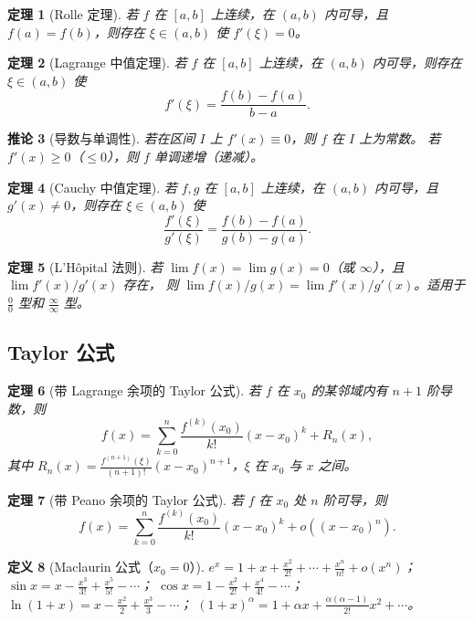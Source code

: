 \documentclass[12pt,a4paper]{ctexart}
\newtheorem{theorem}{定理}[section]
\newtheorem{definition}[theorem]{定义}
\newtheorem{corollary}[theorem]{推论}
\theoremstyle{remark}
\begin{document}
\begin{theorem}[Rolle 定理]
若 $f$ 在 $[a,b]$ 上连续，在 $(a,b)$ 内可导，且 $f(a)=f(b)$，则存在
$\xi \in (a,b)$ 使 $f'(\xi) = 0$。
\end{theorem}

\begin{theorem}[Lagrange 中值定理]
若 $f$ 在 $[a,b]$ 上连续，在 $(a,b)$ 内可导，则存在 $\xi \in (a,b)$ 使
\[
f'(\xi) = \frac{f(b)-f(a)}{b-a}.
\]
\end{theorem}

\begin{corollary}[导数与单调性]
若在区间 $I$ 上 $f'(x) \equiv 0$，则 $f$ 在 $I$ 上为常数。
若 $f'(x) \ge 0$（$\le 0$），则 $f$ 单调递增（递减）。
\end{corollary}

\begin{theorem}[Cauchy 中值定理]
若 $f,g$ 在 $[a,b]$ 上连续，在 $(a,b)$ 内可导，且 $g'(x) \neq 0$，则存在 $\xi \in (a,b)$ 使
\[
\frac{f'(\xi)}{g'(\xi)} = \frac{f(b)-f(a)}{g(b)-g(a)}.
\]
\end{theorem}

\begin{theorem}[L'H\^opital 法则]
若 $\lim f(x) = \lim g(x) = 0$（或 $\infty$），且 $\lim f'(x)/g'(x)$ 存在，
则 $\lim f(x)/g(x) = \lim f'(x)/g'(x)$。适用于 $\frac{0}{0}$ 型和 $\frac{\infty}{\infty}$ 型。
\end{theorem}

\subsection{Taylor 公式}

\begin{theorem}[带 Lagrange 余项的 Taylor 公式]
若 $f$ 在 $x_0$ 的某邻域内有 $n+1$ 阶导数，则
\[
f(x) = \sum_{k=0}^n \frac{f^{(k)}(x_0)}{k!}(x-x_0)^k + R_n(x),
\]
其中 $R_n(x) = \frac{f^{(n+1)}(\xi)}{(n+1)!}(x-x_0)^{n+1}$，$\xi$ 在 $x_0$ 与 $x$ 之间。
\end{theorem}

\begin{theorem}[带 Peano 余项的 Taylor 公式]
若 $f$ 在 $x_0$ 处 $n$ 阶可导，则
\[
f(x) = \sum_{k=0}^n \frac{f^{(k)}(x_0)}{k!}(x-x_0)^k + o((x-x_0)^n).
\]
\end{theorem}

\begin{definition}[Maclaurin 公式（$x_0=0$）]
$e^x = 1 + x + \frac{x^2}{2!} + \cdots + \frac{x^n}{n!} + o(x^n)$；
$\sin x = x - \frac{x^3}{3!} + \frac{x^5}{5!} - \cdots$；
$\cos x = 1 - \frac{x^2}{2!} + \frac{x^4}{4!} - \cdots$；
$\ln(1+x) = x - \frac{x^2}{2} + \frac{x^3}{3} - \cdots$；
$(1+x)^\alpha = 1 + \alpha x + \frac{\alpha(\alpha-1)}{2!}x^2 + \cdots$。
\end{definition}
\end{document}
